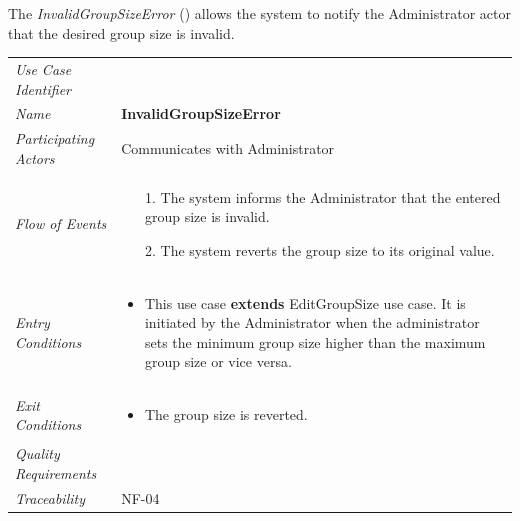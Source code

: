 \documentclass[12pt,letterpaper]{article}
\begin{document}
\newpage{}

The {\it InvalidGroupSizeError} ({\bf \invalidgroupsizeerror{}}) allows the system to notify the Administrator actor that the desired group size is invalid.

\begin{center}
	\begin{tabu} to 
		\toprule
		Use Case Identifier & \invalidgroupsizeerror{} \\
		Name & {\bf InvalidGroupSizeError} \\
		Participating Actors & Communicates with Administrator \\
		Flow of Events & 
		\begin{minipage}[t]{\linewidth}
		    \begin{enumerate}
			    \item[1.] The system informs the Administrator that the entered group size is invalid.
			    \item[2.] The system reverts the group size to its original value.
			\end{enumerate}
        \end{minipage} \\

		Entry Conditions &
		\begin{minipage}[t]{\linewidth}
			\begin{itemize}
			    \item This use case \textbf{extends} EditGroupSize use case. It is initiated by the Administrator when the administrator sets the minimum group size higher than the maximum group size or vice versa.
	        \end{itemize}
        \end{minipage} \\

		Exit Conditions &
		\begin{minipage}[t]{\linewidth}
			\begin{itemize}
			    \item The group size is reverted.
	        \end{itemize}
        \end{minipage} \\

		Quality Requirements & \\

		Traceability & NF-04 \\
		\toprule
	\end{tabu}
\end{center}
\end{document}
